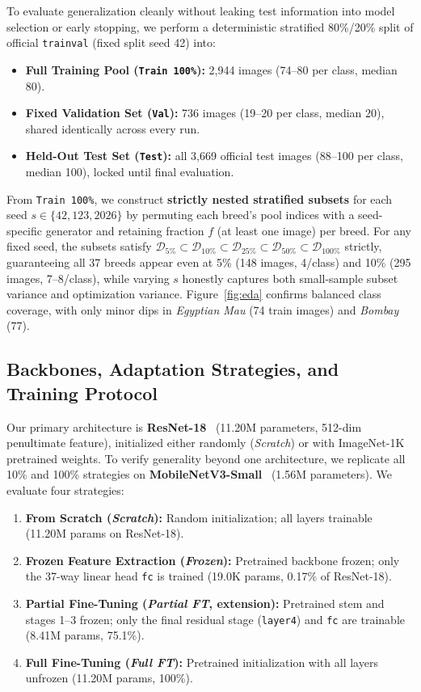 \documentclass[sigconf,nonacm]{acmart}
\begin{document}
To evaluate generalization cleanly without leaking test information into model selection or early stopping, we perform a deterministic stratified 80\%/20\% split of official \texttt{trainval} (fixed split seed 42) into:
\begin{itemize}
  \item \textbf{Full Training Pool (\texttt{Train 100\%}):} 2,944 images (74--80 per class, median 80).
  \item \textbf{Fixed Validation Set (\texttt{Val}):} 736 images (19--20 per class, median 20), shared identically across every run.
  \item \textbf{Held-Out Test Set (\texttt{Test}):} all 3,669 official test images (88--100 per class, median 100), locked until final evaluation.
\end{itemize}

From \texttt{Train 100\%}, we construct \textbf{strictly nested stratified subsets} for each seed $s \in \{42, 123, 2026\}$ by permuting each breed's pool indices with a seed-specific generator and retaining fraction $f$ (at least one image) per breed. For any fixed seed, the subsets satisfy $\mathcal{D}_{5\%} \subset \mathcal{D}_{10\%} \subset \mathcal{D}_{25\%} \subset \mathcal{D}_{50\%} \subset \mathcal{D}_{100\%}$ strictly, guaranteeing all 37 breeds appear even at 5\% (148 images, 4/class) and 10\% (295 images, 7--8/class), while varying $s$ honestly captures both small-sample subset variance and optimization variance. Figure~\ref{fig:eda} confirms balanced class coverage, with only minor dips in \emph{Egyptian Mau} (74 train images) and \emph{Bombay} (77).

\subsection{Backbones, Adaptation Strategies, and Training Protocol}
Our primary architecture is \textbf{ResNet-18}~\cite{he2016deep} (11.20M parameters, 512-dim penultimate feature), initialized either randomly (\emph{Scratch}) or with ImageNet-1K pretrained weights. To verify generality beyond one architecture, we replicate all 10\% and 100\% strategies on \textbf{MobileNetV3-Small}~\cite{howard2019searching} (1.56M parameters). We evaluate four strategies:
\begin{enumerate}
  \item \textbf{From Scratch (\emph{Scratch}):} Random initialization; all layers trainable (11.20M params on ResNet-18).
  \item \textbf{Frozen Feature Extraction (\emph{Frozen}):} Pretrained backbone frozen; only the 37-way linear head \texttt{fc} is trained (19.0K params, 0.17\% of ResNet-18).
  \item \textbf{Partial Fine-Tuning (\emph{Partial FT}, extension):} Pretrained stem and stages 1--3 frozen; only the final residual stage (\texttt{layer4}) and \texttt{fc} are trainable (8.41M params, 75.1\%).
  \item \textbf{Full Fine-Tuning (\emph{Full FT}):} Pretrained initialization with all layers unfrozen (11.20M params, 100\%).
\end{enumerate}
\end{document}

